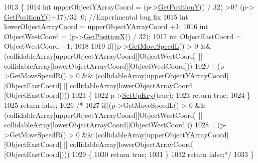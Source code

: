 \begin{DoxyCode}
1013 \{
1014     \textcolor{keywordtype}{int} upperObjectYArrayCoord = (p->\hyperlink{classPrincessObject_ab467215d25ae8ea54e55888fc78222db}{GetPositionY}() / 32) >0? (p->
      \hyperlink{classPrincessObject_ab467215d25ae8ea54e55888fc78222db}{GetPositionY}()+17)/32 :0; \textcolor{comment}{//Experimental bug fix}
1015     \textcolor{keywordtype}{int} lowerObjectArrayCoord = upperObjectYArrayCoord +1;
1016     \textcolor{keywordtype}{int} ObjectWestCoord = (p->\hyperlink{classPrincessObject_a8fe6db722d044576a107ebed4d9efd90}{GetPositionX}() / 32);
1017     \textcolor{keywordtype}{int} ObjectEastCoord = ObjectWestCoord +1;
1018 
1019     \textcolor{keywordflow}{if}((p->\hyperlink{classPrincessObject_a10f0fd59ffaadb4fd04195736f62dff0}{GetMoveSpeedL}() > 0 && (collidableArray[upperObjectYArrayCoord][ObjectWestCoord] ||
       collidableArray[lowerObjectArrayCoord][ObjectWestCoord]))
1020        || (p->\hyperlink{classPrincessObject_a084245be26f1d64b6842901397f834c2}{GetMoveSpeedR}() > 0 && (collidableArray[upperObjectYArrayCoord][ObjectEastCoord]
       || collidableArray[lowerObjectArrayCoord][ObjectEastCoord])))
1021     \{
1022         p->\hyperlink{classPrincessObject_a68daadc8a6eba6e4c79f15816235d2f3}{SetUpKey}(\textcolor{keyword}{true});
1023         \textcolor{keywordflow}{return} \textcolor{keyword}{true};
1024     \}
1025     \textcolor{keywordflow}{return} \textcolor{keyword}{false};
1026     \textcolor{comment}{/*}
1027 \textcolor{comment}{    if((p->GetMoveSpeedL() > 0 && (collidableArray[upperObjectYArrayCoord][ObjectWestCoord] ||
       collidableArray[lowerObjectArrayCoord][ObjectWestCoord]))}
1028 \textcolor{comment}{       || (p->GetMoveSpeedR() > 0 && (collidableArray[upperObjectYArrayCoord][ObjectEastCoord] ||
       collidableArray[lowerObjectArrayCoord][ObjectEastCoord])))}
1029 \textcolor{comment}{    \{}
1030 \textcolor{comment}{        return true;}
1031 \textcolor{comment}{    \}}
1032 \textcolor{comment}{    return false;*/}
1033 \}
\end{DoxyCode}
